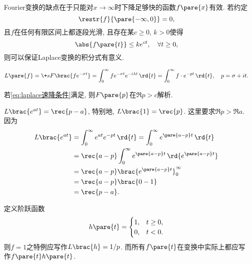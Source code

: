 \documentclass[../ComplexVariable.tex]{subfiles}
\begin{document}
Fourier变换的缺点在于只能对$x\rightarrow \infty$时下降足够快的函数$f\pare{x}$有效. 若约定
\[ \restr{f}{\pare{-\infty, 0}} = 0, \]
且$f$在任何有限区间上都逐段光滑, 且存在某$c\ge 0$, $k>0$使得
\begin{equation}
    \label{eq:laplace速降条件}
    \abs{f\pare{t}} \le ke^{ct},\quad \forall t\ge 0,
\end{equation}
则可以保证Laplace变换的积分式有意义.
\begin{definition}[Laplace变换]
    \[ L\pare{f} = \+sF\brac{fe^{-\sigma t}} = \int_0^\infty fe^{-\sigma t} e^{-i\lambda t}\,\rd{t} = \int_0^\infty f\cdot e^{-pt}\,\rd{t},\quad p = \sigma + it. \]
\end{definition}
\begin{proposition}
    若\eqref{eq:laplace速降条件}满足, 则$F\pare{p}$在$\Re p > c$解析.
\end{proposition}
\begin{sample}
    \begin{ex}
        $L\brac{e^{at}} = \displaystyle \rec{p-a}$, 特别地, $L\brac{1} = \displaystyle \rec{p}$. 这里要求$\Re p > \Re a$. 因为
        \begin{align*}
            L\brac{e^{at}} &= \int_0^\infty e^{at}e^{-pt}\,\rd{t} = \int_0^\infty e^{\pare{a-p}t}\,\rd{t} \\
            &= \rec{a-p}\int_0^\infty e^{\pare{a-p}t}\,\rd{e^{\pare{a-p}t}} \\
            &= \rec{a-p}\brac{e^{\pare{a-p}t}}_0^\infty \\
            &= \rec{a-p}\brac{0-1} \\
            &= \rec{p-a}.
        \end{align*}
    \end{ex}
    \begin{remark}
        定义阶跃函数
        \[ h\pare{t} = \begin{cases}
            1, & t\ge 0,\\
            0, & t<0.
        \end{cases} \]
        则$f=1$之特例应写作$L\brac{h} = 1/p$. 而所有$f\pare{t}$在变换中实际上都应写作$f\pare{t}h\pare{t}$.
    \end{remark}
\end{sample}
\end{document}
